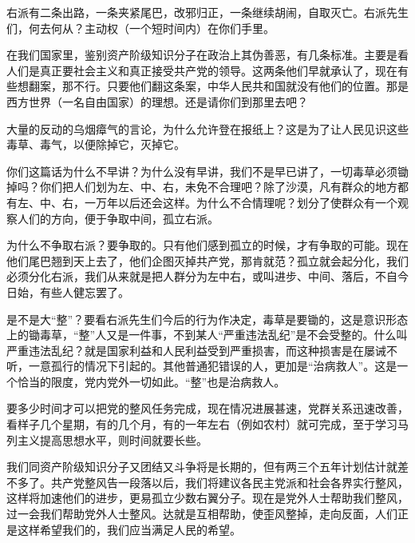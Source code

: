 右派有二条出路，一条夹紧尾巴，改邪归正，一条继续胡闹，自取灭亡。右派先生们，何去何从？主动权（一个短时间内）在你们手里。

在我们国家里，鉴别资产阶级知识分子在政治上其伪善恶，有几条标准。主要是看人们是真正要社会主义和真正接受共产党的领导。这两条他们早就承认了，现在有些想翻案，那不行。只要他们翻这条案，中华人民共和国就没有他们的位置。那是西方世界（一名自由国家）的理想。还是请你们到那里去吧？

大量的反动的乌烟瘴气的言论，为什么允许登在报纸上？这是为了让人民见识这些毒草、毒气，以便除掉它，灭掉它。

你们这篇话为什么不早讲？为什么没有早讲，我们不是早已讲了，一切毒草必须锄掉吗？你们把人们划为左、中、右，未免不合理吧？除了沙漠，凡有群众的地方都有左、中、右，一万年以后还会这样。为什么不合情理呢？划分了使群众有一个观察人们的方向，便于争取中间，孤立右派。

为什么不争取右派？要争取的。只有他们感到孤立的时候，才有争取的可能。现在他们尾巴翘到天上去了，他们企图灭掉共产党，那肯就范？孤立就会起分化，我们必须分化右派，我们从来就是把人群分为左中右，或叫进步、中间、落后，不自今日始，有些人健忘罢了。

是不是大“整”？要看右派先生们今后的行为作决定，毒草是要锄的，这是意识形态上的锄毒草，“整”人又是一件事，不到某人“严重违法乱纪”是不会受整的。什么叫严重违法乱纪？就是国家利益和人民利益受到严重损害，而这种损害是在屡诫不听，一意孤行的情况下引起的。其他普通犯错误的人，更加是“治病救人”。这是一个恰当的限度，党内党外一切如此。“整”也是治病救人。

要多少时间才可以把党的整风任务完成，现在情况进展甚速，党群关系迅速改善，看样子几个星期，有的几个月，有的一年左右（例如农村）就可完成，至于学习马列主义提高思想水平，则时间就要长些。

我们同资产阶级知识分子又团结又斗争将是长期的，但有两三个五年计划估计就差不多了。共产党整风告一段落以后，我们将建议各民主党派和社会各界实行整风，这样将加速他们的进步，更易孤立少数右翼分子。现在是党外人士帮助我们整风，过一会我们帮助党外人士整风。达就是互相帮助，使歪风整掉，走向反面，人们正是这样希望我们的，我们应当满足人民的希望。


